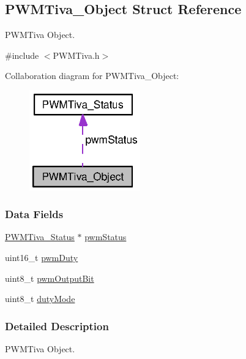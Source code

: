 \subsection{P\-W\-M\-Tiva\-\_\-\-Object Struct Reference}
\label{struct_p_w_m_tiva___object}


P\-W\-M\-Tiva Object.  




{\ttfamily \#include $<$P\-W\-M\-Tiva.\-h$>$}



Collaboration diagram for P\-W\-M\-Tiva\-\_\-\-Object\-:
\nopagebreak
\begin{figure}[H]
\begin{center}
\leavevmode
\includegraphics[width=136pt]{struct_p_w_m_tiva___object__coll__graph}
\end{center}
\end{figure}
\subsubsection*{Data Fields}
\begin{DoxyCompactItemize}
\item 
\hyperlink{struct_p_w_m_tiva___status}{P\-W\-M\-Tiva\-\_\-\-Status} $\ast$ \hyperlink{struct_p_w_m_tiva___object_ac8bd4faf595db91eed648925028a8ee2}{pwm\-Status}
\item 
uint16\-\_\-t \hyperlink{struct_p_w_m_tiva___object_a800cd6659e683499a1d10781f6dd8039}{pwm\-Duty}
\item 
uint8\-\_\-t \hyperlink{struct_p_w_m_tiva___object_a2495251d43ff49e93db61ffaf060225b}{pwm\-Output\-Bit}
\item 
uint8\-\_\-t \hyperlink{struct_p_w_m_tiva___object_a55f216f7bf6438a120a7f0b52726ad55}{duty\-Mode}
\end{DoxyCompactItemize}


\subsubsection{Detailed Description}
P\-W\-M\-Tiva Object. 

